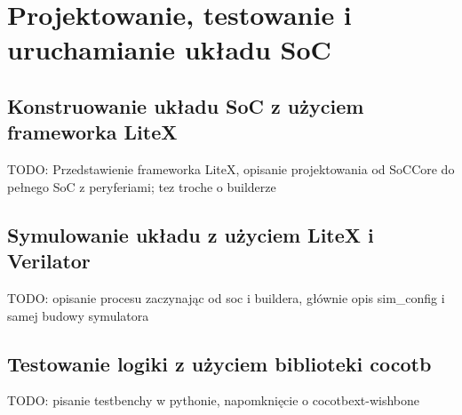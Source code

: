 \section{Projektowanie, testowanie i uruchamianie układu SoC}
\subsection{Konstruowanie układu SoC z użyciem frameworka LiteX}
TODO: Przedstawienie frameworka LiteX\cite{https://doi.org/10.48550/arxiv.2005.02506}, opisanie projektowania od SoCCore do pełnego SoC z peryferiami; tez troche o builderze

\subsection{Symulowanie układu z użyciem LiteX i Verilator}
TODO: opisanie procesu zaczynając od soc i buildera, głównie opis sim_config i samej budowy symulatora

\subsection{Testowanie logiki z użyciem biblioteki cocotb}
TODO: pisanie testbenchy w pythonie, napomknięcie o cocotbext-wishbone